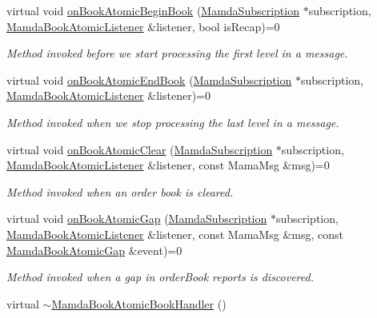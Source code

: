\begin{CompactItemize}
\item 
virtual void \hyperlink{classWombat_1_1MamdaBookAtomicBookHandler_5a895e439d85c872efd611e0c224fe3b}{on\-Book\-Atomic\-Begin\-Book} (\hyperlink{classWombat_1_1MamdaSubscription}{Mamda\-Subscription} $\ast$subscription, \hyperlink{classWombat_1_1MamdaBookAtomicListener}{Mamda\-Book\-Atomic\-Listener} \&listener, bool is\-Recap)=0
\begin{CompactList}\small\item\em Method invoked before we start processing the first level in a message. \item\end{CompactList}\item 
virtual void \hyperlink{classWombat_1_1MamdaBookAtomicBookHandler_5a19d0ed3fae6747b13cbf3789456dab}{on\-Book\-Atomic\-End\-Book} (\hyperlink{classWombat_1_1MamdaSubscription}{Mamda\-Subscription} $\ast$subscription, \hyperlink{classWombat_1_1MamdaBookAtomicListener}{Mamda\-Book\-Atomic\-Listener} \&listener)=0
\begin{CompactList}\small\item\em Method invoked when we stop processing the last level in a message. \item\end{CompactList}\item 
virtual void \hyperlink{classWombat_1_1MamdaBookAtomicBookHandler_8afec13e558087d9b3ef2deae8ec7eff}{on\-Book\-Atomic\-Clear} (\hyperlink{classWombat_1_1MamdaSubscription}{Mamda\-Subscription} $\ast$subscription, \hyperlink{classWombat_1_1MamdaBookAtomicListener}{Mamda\-Book\-Atomic\-Listener} \&listener, const Mama\-Msg \&msg)=0
\begin{CompactList}\small\item\em Method invoked when an order book is cleared. \item\end{CompactList}\item 
virtual void \hyperlink{classWombat_1_1MamdaBookAtomicBookHandler_cbcf3035872b8a2c22bc61adf2e4e491}{on\-Book\-Atomic\-Gap} (\hyperlink{classWombat_1_1MamdaSubscription}{Mamda\-Subscription} $\ast$subscription, \hyperlink{classWombat_1_1MamdaBookAtomicListener}{Mamda\-Book\-Atomic\-Listener} \&listener, const Mama\-Msg \&msg, const \hyperlink{classWombat_1_1MamdaBookAtomicGap}{Mamda\-Book\-Atomic\-Gap} \&event)=0
\begin{CompactList}\small\item\em Method invoked when a gap in order\-Book reports is discovered. \item\end{CompactList}\item 
virtual \hyperlink{classWombat_1_1MamdaBookAtomicBookHandler_91dc42d1b4fad75fd1322e12b07d0f41}{$\sim$Mamda\-Book\-Atomic\-Book\-Handler} ()
\end{CompactItemize}


